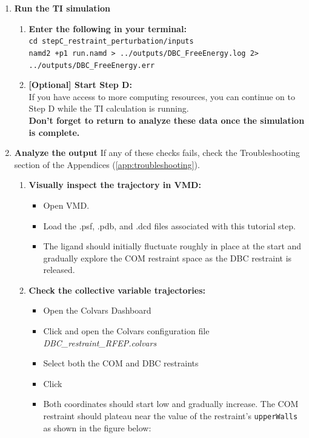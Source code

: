 \documentclass[9pt,tutorial]{Styling/livecoms}
\newcommand{\filepath}[1]{\textit{#1}}
\newcommand{\button}[1]{\inlineBox[gray]{\texttt{#1}}}
\newcommand{\textInput}[1]{\texttt{#1}}
\begin{document}
\begin{enumerate}
        \item \textbf{Run the TI simulation} 
        \begin{enumerate}[label=\alph*., ref=\theenumi.\alph*]
            \item \textbf{Enter the following in your terminal:}\\
            \textInput{cd stepC\_restraint\_perturbation/inputs}\\
            \textInput{namd2 +p1 run.namd > ../outputs/DBC\_FreeEnergy.log 2> ../outputs/DBC\_FreeEnergy.err}
            \item \textbf{[Optional] Start Step D:}\\
            If you have access to more computing resources, you can continue on to Step D while the TI calculation is running.\\
            \textbf{Don't forget to return to analyze these data once the simulation is complete.}
        \end{enumerate}
        \item \textbf{Analyze the output} \label{step:analyzeRFEP}
        If any of these checks fails, check the Troubleshooting section of the Appendices (\ref{app:troubleshooting}).
        \begin{enumerate}[label=\alph*., ref=\theenumi.\alph*]
            \item \textbf{Visually inspect the trajectory in VMD:}
            \begin{itemize}
                \item Open VMD.
                \item Load the .psf, .pdb, and .dcd files associated with this tutorial step.
                \item The ligand should initially fluctuate roughly in place at the start and gradually explore the COM restraint space as the DBC restraint is released. 
            \end{itemize}
            \item \label{step:CV_traj} \textbf{Check the collective variable trajectories:}
            \begin{itemize}
                \item Open the Colvars Dashboard
                \item Click \button{Load} and open the Colvars configuration file \filepath{DBC\_restraint\_RFEP.colvars}
                \item Select both the COM and DBC restraints
                \item Click \button{Timeline plot}
                \item Both coordinates should start low and gradually increase. The COM restraint should plateau near the value of the restraint's \textInput{upperWalls} as shown in the figure below:
                

\end{itemize}
\end{enumerate}
\end{enumerate}
\end{document}
